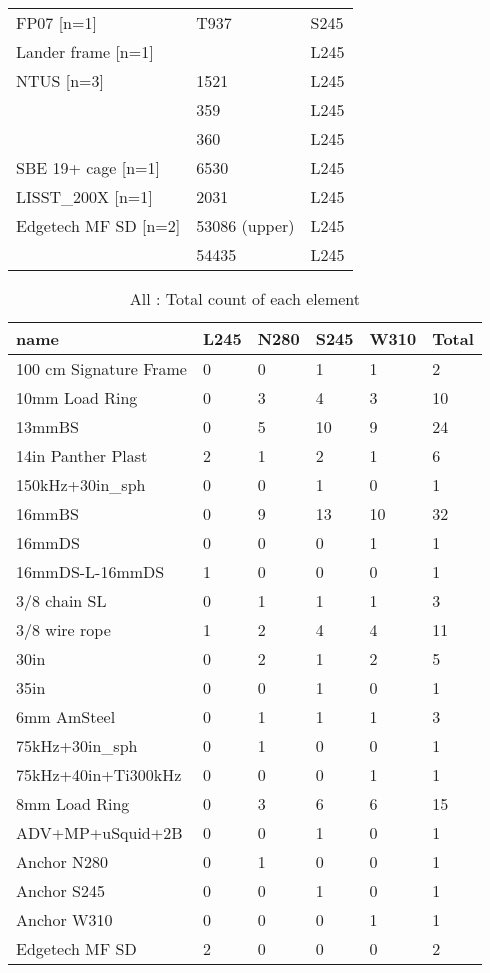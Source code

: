 \documentclass{article}
\begin{document}
\begin{table}[!htbp]
\begin{tabular}{lll}
FP07 [n=1] & T937 & S245 \\
Lander frame [n=1] &  & L245 \\
NTUS [n=3] & 1521 & L245 \\
 & 359 & L245 \\
 & 360 & L245 \\
SBE 19+ cage [n=1] & 6530 & L245 \\
LISST\_200X [n=1] & 2031 & L245 \\
Edgetech MF SD [n=2] & 53086 (upper) & L245 \\
 & 54435 & L245 \\
\bottomrule
\end{tabular}
\end{table}

\begin{table}[!htbp]
\centering
\caption{All : Total count of each element}
\begin{tabular}{llllll}
\toprule
name & L245 & N280 & S245 & W310 & Total \\
\midrule
100 cm Signature Frame & 0 & 0 & 1 & 1 & 2 \\
10mm Load Ring & 0 & 3 & 4 & 3 & 10 \\
13mmBS & 0 & 5 & 10 & 9 & 24 \\
14in Panther Plast & 2 & 1 & 2 & 1 & 6 \\
150kHz+30in\_sph & 0 & 0 & 1 & 0 & 1 \\
16mmBS & 0 & 9 & 13 & 10 & 32 \\
16mmDS & 0 & 0 & 0 & 1 & 1 \\
16mmDS-L-16mmDS & 1 & 0 & 0 & 0 & 1 \\
3/8 chain SL & 0 & 1 & 1 & 1 & 3 \\
3/8 wire rope & 1 & 2 & 4 & 4 & 11 \\
30in & 0 & 2 & 1 & 2 & 5 \\
35in & 0 & 0 & 1 & 0 & 1 \\
6mm AmSteel & 0 & 1 & 1 & 1 & 3 \\
75kHz+30in\_sph & 0 & 1 & 0 & 0 & 1 \\
75kHz+40in+Ti300kHz & 0 & 0 & 0 & 1 & 1 \\
8mm Load Ring & 0 & 3 & 6 & 6 & 15 \\
ADV+MP+uSquid+2B & 0 & 0 & 1 & 0 & 1 \\
Anchor N280 & 0 & 1 & 0 & 0 & 1 \\
Anchor S245 & 0 & 0 & 1 & 0 & 1 \\
Anchor W310 & 0 & 0 & 0 & 1 & 1 \\
Edgetech MF SD & 2 & 0 & 0 & 0 & 2 \\

\end{tabular}
\end{table}
\end{document}
